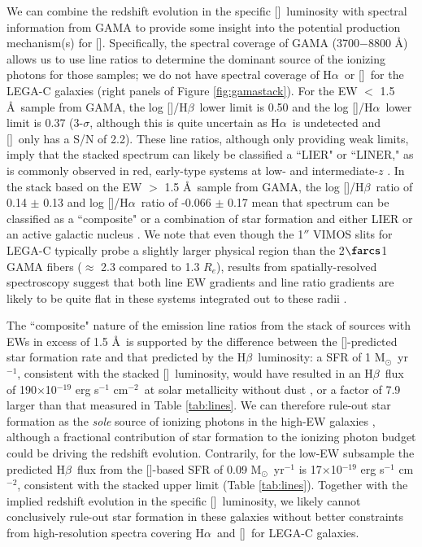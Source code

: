 \documentclass[twocolumn,natbib,iop,hyperref]{aastex62}
\newcommand{\msol}{M$_{\odot}$}
\newcommand{\cgs}{erg s$^{-1}$ cm$^{-2}$}
\newcommand{\nii}{[\ion{N}{2}]}
\newcommand{\hb}{H$\beta$}
\newcommand{\oiii}{[\ion{O}{3}]}
\newcommand{\oii}{[\ion{O}{2}]}
\newcommand{\ha}{H$\alpha$}
\begin{document}
We can combine the redshift evolution in the specific \oii\ luminosity with spectral information from GAMA to provide some insight into the potential production mechanism(s) for \oii.  Specifically, the spectral coverage of GAMA (3700$-$8800 \AA) allows us to use line ratios to determine the dominant source of the ionizing photons for those samples; we do not have spectral coverage of \ha\ or \nii\ for the LEGA-C galaxies (right panels of Figure \ref{fig:gamastack}).  For the EW $<$ 1.5 \AA\ sample from GAMA, the log \oiii/\hb\ lower limit is 0.50 and the log \nii/\ha\ lower limit is 0.37 (3-$\sigma$, although this is quite uncertain as \ha\ is undetected and \nii\ only has a S/N of 2.2).   These line ratios, although only providing weak limits, imply that the stacked spectrum can likely be classified a ``LIER" or ``LINER," as is commonly observed in red, early-type systems at low- and intermediate-$z$ \cite[e.g.][]{2006ApJ...648..281Y,2013MNRAS.429.2212M,2010ApJ...716..970L,2012ApJ...747...61Y,2013AA...558A..43S,2016MNRAS.461.3111B}.  In the stack based on the EW $>$ 1.5 \AA\ sample from GAMA, the log \oiii/\hb\ ratio of 0.14 $\pm$ 0.13 and log \nii/\ha\ ratio of -0.066 $\pm$ 0.17 mean that spectrum can be classified as a ``composite" or a combination of star formation and either LIER or an active galactic nucleus \citep{2006MNRAS.372..961K}.  We note that even though the 1$''$ VIMOS slits for LEGA-C typically probe a slightly larger physical region than the 2$\farcs$1 GAMA fibers ($\approx$ 2.3 compared to 1.3 $R_e$), results from spatially-resolved spectroscopy suggest that both line EW gradients and line ratio gradients are likely to be quite flat in these systems integrated out to these radii \citep{2016MNRAS.461.3111B}.  

The ``composite" nature of the emission line ratios from the stack of sources with EWs in excess of 1.5 \AA\ is supported by the difference between the \oii-predicted star formation rate and that predicted by the \hb\ luminosity: a SFR of 1 \msol\ yr$^{-1}$, consistent with the stacked \oii\ luminosity, would have resulted in an \hb\ flux of 190$\times$10$^{-19}$ \cgs\ at solar metallicity without dust \citep{2011ApJ...737...67M}, or a factor of 7.9 larger than that measured in Table \ref{tab:lines}.  We can therefore rule-out star formation as the \textit{sole} source of ionizing photons in the high-EW galaxies \cite[modulo the effects of metallicity, age, or dust attenuation;][]{2004AJ....127.2002K}, although a fractional contribution of star formation to the ionizing photon budget could be driving the redshift evolution.  Contrarily, for the low-EW subsample the predicted \hb\ flux from the \oii-based SFR of 0.09 \msol\ yr$^{-1}$ is 17$\times$10$^{-19}$ \cgs, consistent with the stacked upper limit (Table \ref{tab:lines}).  Together with the implied redshift evolution in the specific \oii\ luminosity, we likely cannot conclusively rule-out star formation in these galaxies without better constraints from high-resolution spectra covering \ha\ and \nii\ for LEGA-C galaxies.  
\end{document}
